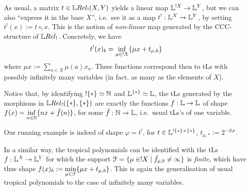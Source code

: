 
 As usual, a matrix $t\in\HOM{\LREL_!}{X}{Y}$ yields a linear map $\mathbb{L}^{!X}\to\mathbb{L}^Y$, but we can also ``express it in the base $X$'', i.e.\ see it as a map $t^!:\mathbb{L}^X\to\mathbb{L}^Y$, by setting 
 $t^!(x):=t\circ_! x$.
 This is the notion of \emph{non-linear} map generated by the CCC-structure of $\LREL_!$.
 Concretely, we have
 \begin{equation}
 t^!(x)_b=\inf\limits_{\mu\in !X} \{\mu x+ t_{\mu,b}\}
 \end{equation}
 where $\mu x:=\sum\limits_{a\in X} \mu(a)x_a$.
 These functions correspond then to tLs with possibly infinitely many variables (in fact, as many as the elements of $X$). %
 
% 
%

Notice that, by identifying $!\{*\}\simeq \mathbb{N}$ and $\mathbb{L}^{\{*\}}\simeq\mathbb{L}$, the tLs generated by the morphisms in $\HOM{\LREL_!}{\set{*}}{\set{*}}$ are exactly the functions $f:\mathbb{L}\to\mathbb{L}$ of shape $f(x)=\inf\limits_{n\in\mathbb{N}}\{nx+\hat{f}(n)\}$, for some $\hat{f}:\mathbb{N}\to\mathbb{L}$, i.e.\ usual tLs's of one variable.
 \begin{remark}
 Our running example is indeed of shape $\varphi=t^!$, for $t\in\mathbb{L}^{!\{*\}\times\{*\}}$, $t_{\mu,*}:=2^{-\# \mu}$.
\end{remark}



 In a similar way, the tropical polynomials can be identified with the tLs
$f:\mathbb{L}^X\to\mathbb{L}^Y$ 
 for which the support $\mathcal{F}=\{\mu\in!X\mid\hat{f}_{\mu,b}\neq\infty\}$ is \emph{finite}, which have thus shape $f(x)_b:=\min\limits_{\mu\in\mathcal{F}} \{\mu x+ t_{\mu,b}\}$.
 This is again the generalisation of usual tropical polynomials to the case of infinitely many variables.

